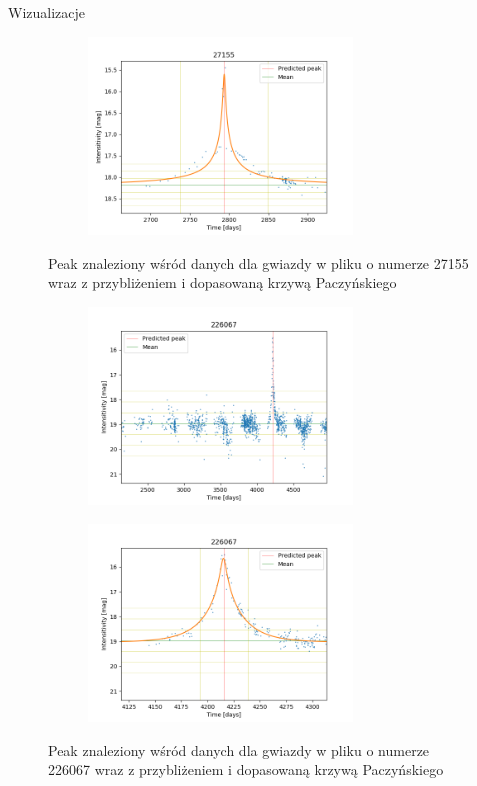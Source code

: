 \documentclass[a4paper,11pt]{article}
\begin{document}
\begin{subsection}{Wizualizacje}
\begin{figure}[H]
\begin{subfigure}{0.5\textwidth}
\centering
\includegraphics[width=\linewidth,height=5.25cm]{27155_v.png}
\label{Fig_9}
\end{subfigure}
\caption{Peak znaleziony wśród danych dla gwiazdy w pliku o numerze 27155 wraz z przybliżeniem i dopasowaną krzywą Paczyńskiego}
\end{figure}
\begin{figure}[H]
\begin{subfigure}{0.5\textwidth}
\centering
\includegraphics[width=\linewidth,height=5.25cm]{226067.png}
\label{Fig_12}
\end{subfigure}
\begin{subfigure}{0.5\textwidth}
\centering
\includegraphics[width=\linewidth,height=5.25cm]{226067_v.png}
\label{Fig_13}
\end{subfigure}
\caption{Peak znaleziony wśród danych dla gwiazdy w pliku o numerze 226067 wraz z przybliżeniem i dopasowaną krzywą Paczyńskiego}
\end{figure}
\end{subsection}

\end{document}
